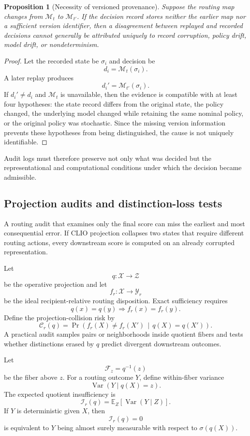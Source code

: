 \documentclass[11pt]{article}
\newtheorem{proposition}[definition]{Proposition}
\theoremstyle{definition}
\DeclareMathOperator{\Var}{Var}
\DeclareMathOperator{\Prob}{Pr}
\newcommand{\E}{\mathbb{E}}
\newcommand{\given}{\,\middle|\,}
\begin{document}
\begin{proposition}[Necessity of versioned provenance]
Suppose the routing map changes from \(\mathcal{M}_t\) to \(\mathcal{M}_{t'}\). If the decision record stores neither the earlier map nor a sufficient version identifier, then a disagreement between replayed and recorded decisions cannot generally be attributed uniquely to record corruption, policy drift, model drift, or nondeterminism.
\end{proposition}

\begin{proof}
Let the recorded state be \(\sigma_i\) and decision be
\[
d_i=\mathcal{M}_t(\sigma_i).
\]
A later replay produces
\[
d_i'=\mathcal{M}_{t'}(\sigma_i).
\]
If \(d_i'\neq d_i\) and \(\mathcal{M}_t\) is unavailable, then the evidence is compatible with at least four hypotheses: the state record differs from the original state, the policy changed, the underlying model changed while retaining the same nominal policy, or the original policy was stochastic. Since the missing version information prevents these hypotheses from being distinguished, the cause is not uniquely identifiable.
\end{proof}

Audit logs must therefore preserve not only what was decided but the representational and computational conditions under which the decision became admissible.

\subsection{Projection audits and distinction-loss tests}

A routing audit that examines only the final score can miss the earliest and most consequential error. If CLIO projection collapses two states that require different routing actions, every downstream score is computed on an already corrupted representation.

Let
\[
q:\mathcal{X}\to\mathcal{Z}
\]
be the operative projection and let
\[
f_r:\mathcal{X}\to\mathcal{Y}_r
\]
be the ideal recipient-relative routing disposition. Exact sufficiency requires
\[
q(x)=q(y)
\Longrightarrow
f_r(x)=f_r(y).
\]
Define the projection-collision risk by
\[
\mathcal{C}_r(q)
=
\Prob\!\left(
f_r(X)\neq f_r(X')
\given
q(X)=q(X')
\right).
\]
A practical audit samples pairs or neighborhoods inside quotient fibers and tests whether distinctions erased by \(q\) predict divergent downstream outcomes.

Let
\[
\mathcal{F}_z=q^{-1}(z)
\]
be the fiber above \(z\). For a routing outcome \(Y\), define within-fiber variance
\[
\Var(Y\mid q(X)=z).
\]
The expected quotient insufficiency is
\[
\mathcal{I}_r(q)
=
\E_{Z}
\left[
\Var(Y\mid Z)
\right].
\]
If \(Y\) is deterministic given \(X\), then
\[
\mathcal{I}_r(q)=0
\]
is equivalent to \(Y\) being almost surely measurable with respect to \(\sigma(q(X))\).
\end{document}
